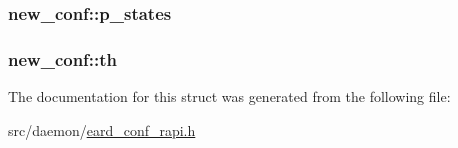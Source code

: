 \subsubsection[{\texorpdfstring{p\+\_\+states}{p_states}}]{ new\+\_\+conf\+::p\+\_\+states}\hypertarget{structnew__conf_acf3eef39107cf56589d1b891e07db17c}{}\label{structnew__conf_acf3eef39107cf56589d1b891e07db17c}
\subsubsection[{\texorpdfstring{th}{th}}]{ new\+\_\+conf\+::th}\hypertarget{structnew__conf_a7d58694fafbd9cb652e3ab4a82b7086a}{}\label{structnew__conf_a7d58694fafbd9cb652e3ab4a82b7086a}


The documentation for this struct was generated from the following file\+:\begin{DoxyCompactItemize}
\item 
src/daemon/\hyperlink{eard__conf__rapi_8h}{eard\+\_\+conf\+\_\+rapi.\+h}\end{DoxyCompactItemize}
